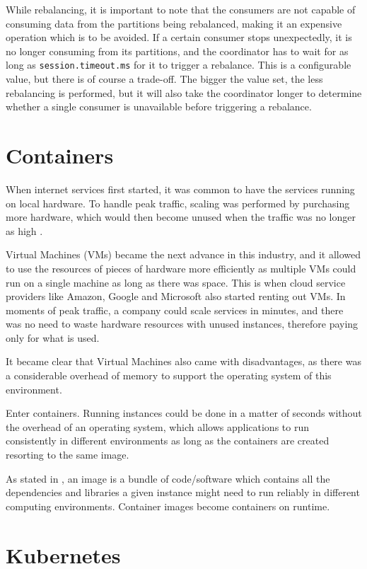 While rebalancing, it is important to note that the consumers are not capable of
consuming data from the partitions being rebalanced, making it an expensive
operation which is to be avoided. If a certain consumer stops unexpectedly, it
is no longer consuming from its partitions, and the coordinator has to wait for
as long as \lstinline{session.timeout.ms} for it to trigger a rebalance. This is a
configurable value, but there is of course a trade-off. The bigger the value
set, the less rebalancing is performed, but it will also take the coordinator
longer to determine whether a single consumer is unavailable before triggering a
rebalance. 

\section{Containers} \label{sec:COM}

When internet services first started, it was common to have the services running
on local hardware. To handle peak traffic, scaling was performed by purchasing
more hardware, which would then become unused when the traffic was no longer as
high \cite[Chapter~1]{smith2017docker}.

Virtual Machines (VMs) became the next advance in this industry, and it allowed
to use the resources of pieces of hardware more efficiently as multiple VMs
could run on a single machine as long as there was space. This is when cloud
service providers like Amazon, Google and Microsoft also started renting out
VMs. In moments of peak traffic, a company could scale services in minutes, and
there was no need to waste hardware resources with unused instances, therefore
paying only for what is used.

It became clear that Virtual Machines also came with disadvantages, as there was
a considerable overhead of memory to support the operating system of this
environment.

Enter containers. Running instances could be done in a matter of seconds without
the overhead of an operating system, which allows applications to run
consistently in different environments as long as the containers are created
resorting to the same image.

As stated in \cite{DockerContainer}, an image is a bundle of code/software which
contains all the dependencies and libraries a given instance might need to run
reliably in different computing environments. Container images become containers
on runtime.

\section{Kubernetes} \label{subsec:kubernetes}

